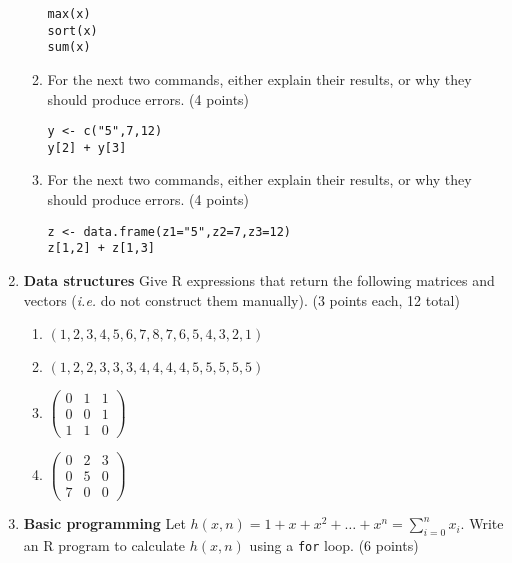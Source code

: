 \documentclass[]{article}
\begin{document}
\begin{enumerate}[1.]
\begin{enumerate}[1.]
\begin{verbatim}
max(x)
sort(x)
sum(x)
\end{verbatim}
  \item
    For the next two commands, either explain their results, or why they
    should produce errors. (4 points)

\begin{verbatim}
y <- c("5",7,12)
y[2] + y[3]
\end{verbatim}
  \item
    For the next two commands, either explain their results, or why they
    should produce errors. (4 points)

\begin{verbatim}
z <- data.frame(z1="5",z2=7,z3=12)
z[1,2] + z[1,3]
\end{verbatim}
  \end{enumerate}
\item
  \textbf{Data structures} Give R expressions that return the following
  matrices and vectors (\emph{i.e.} do not construct them manually). (3
  points each, 12 total)

  \begin{enumerate}[1.]
  \item
    $(1,2,3,4,5,6,7,8,7,6,5,4,3,2,1)$
  \item
    $(1,2,2,3,3,3,4,4,4,4,5,5,5,5,5)$
  \item
    $\left({ \begin{array}{ccc} 0 & 1 & 1 \\
    0 & 0 & 1 \\
    1 & 1 & 0
    \end{array} }\right)$
  \item
    $\left({ \begin{array}{ccc} 0 & 2 & 3 \\
    0 & 5 & 0 \\
    7 & 0 & 0
    \end{array} }\right)$
  \end{enumerate}
\item
  \textbf{Basic programming} Let
  $h(x,n)=1+x+x^2+\ldots+x^n = \sum_{i=0}^n x_i$. Write an R program to
  calculate $h(x,n)$ using a \texttt{for} loop. (6 points)
\end{enumerate}
\end{document}
